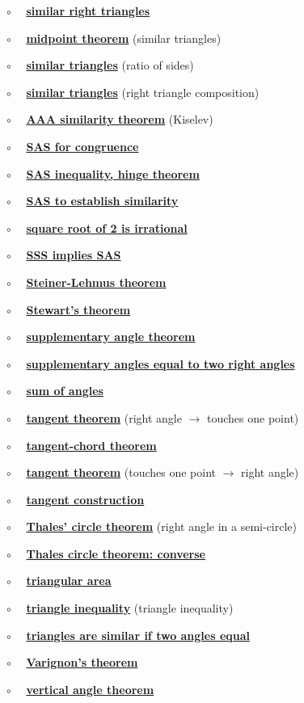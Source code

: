 \documentclass[11pt, oneside]{article}
\begin{document}
$\circ$ \ \ \hyperref[sec:similar_right_triangles]{\textbf{similar right triangles}}

$\circ$ \ \ \hyperref[sec:midpoint_theorem]{\textbf{midpoint theorem}} (similar triangles)

$\circ$ \ \  \hyperref[sec:similarity_equal_ratios]{\textbf{similar triangles}} (ratio of sides)

$\circ$ \ \  \hyperref[sec:similarity_right_to_all_triangles]{\textbf{similar triangles}} (right triangle composition)

$\circ$ \ \ \hyperref[sec:similarity_theorem]{\textbf{AAA similarity theorem}} (Kiselev)

$\circ$ \ \ \hyperref[sec:SAS]{\textbf{SAS for congruence}}

$\circ$ \ \ \hyperref[sec:hinge_theorem]{\textbf{SAS inequality, hinge theorem}}

$\circ$ \ \ \hyperref[sec:SAS_similar]{\textbf{SAS to establish similarity}}

$\circ$ \ \ \hyperref[sec:sqrt_two]{\textbf{square root of 2 is irrational}}

$\circ$ \ \ \hyperref[sec:SSS_implies_SAS]{\textbf{SSS implies SAS}}

$\circ$ \ \ \hyperref[sec:Steiner_Lehmus_Theorem]{\textbf{Steiner-Lehmus theorem}}

$\circ$ \ \ \hyperref[sec:Stewarts_theorem]{\textbf{Stewart's theorem}}

$\circ$ \ \ \hyperref[sec:supplementary_angle_theorem]{\textbf{supplementary angle theorem}}

$\circ$ \ \ \hyperref[sec:two_supplementary_equal_two_right]{\textbf{supplementary angles equal to two right angles}}

$\circ$ \ \  \hyperref[sec:triangle_sum_theorem]{\textbf{sum of angles}}

$\circ$ \ \ \hyperref[sec:tangent_one_point]{\textbf{tangent theorem}} (right angle $\rightarrow$ touches one point)

$\circ$ \ \ \hyperref[sec:tangent_chord_theorem]{\textbf{tangent-chord theorem}}

$\circ$ \ \ \hyperref[sec:tangent_perpendicular]{\textbf{tangent theorem}} (touches one point $\rightarrow$ right angle)

$\circ$ \ \ \hyperref[sec:tangent_construction]{\textbf{tangent construction}}

$\circ$ \ \ \hyperref[sec:Thales_theorem]{\textbf{Thales' circle theorem}} (right angle in a semi-circle)

$\circ$ \ \ \hyperref[sec:Thales_circle_theorem_converse]{\textbf{Thales circle theorem:  converse}}

$\circ$ \ \ \hyperref[sec:triangle_area]{\textbf{triangular area}}

$\circ$ \ \ \hyperref[sec:triangle_inequality]{\textbf{triangle inequality}} (triangle inequality)

$\circ$ \ \ \hyperref[sec:two_angles_similar]{\textbf{triangles are similar if two angles equal}}

$\circ$ \ \ \hyperref[sec:Varignon_theorem]{\textbf{Varignon's theorem}}

$\circ$ \ \ \hyperref[sec:vertical_angle_theorem]{\textbf{vertical angle theorem}}
\end{document}
